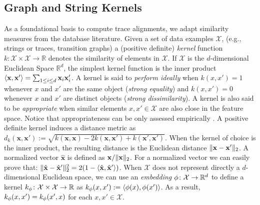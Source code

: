 

\subsection{Graph and String Kernels}\label{subsec:katk}
 As a foundational basis to compute trace alignments, we adapt similarity measures from the database literature.  Given a set of data examples $\mathcal{X}$, (e.g., strings or traces, transition graphs) a (positive definite) \emph{kernel} function $k\colon \mathcal{X}\times \mathcal{X}\to \mathbb{R}$ denotes the similarity of elements in $\mathcal{X}$. If $\mathcal{X}$ is the $d$-dimensional Euclidean Space $\mathbb{R}^d$, the simplest kernel function is the inner product $\Braket{\mathbf{x},\mathbf{x}'}=\sum_{1\leq i\leq d}\mathbf{x}_i\mathbf{x}'_i$.
A kernel is said to \emph{perform ideally} \cite{Gartner03} when $k(x,x')=1$ whenever $x$ and $x'$ are the same object (\textit{strong equality}) and $k(x,x')=0$ whenever $x$ and $x'$ are distinct objects (\textit{strong dissimilarity}). A kernel is also said to be \emph{appropriate} when similar elements $x,x'\in\mathcal{X}$ are also close in the feature space. Notice that appropriateness can be only assessed  empirically \cite{Gartner03}.
A positive definite kernel induces a distance metric as 
$
d_k(\mathbf{x},\mathbf{x}'):=\sqrt{k(\mathbf{x},\mathbf{x})-2k(\mathbf{x},\mathbf{x}')+k(\mathbf{x}',\mathbf{x}')}
$.
When the kernel of choice is the inner product, the resulting distance is the Euclidean distance $\|\mathbf{x}-\mathbf{x}'\|_{2}$. A normalized vector $\hat{\mathbf{x}}$ is defined as $\mathbf{x}/\|\mathbf{x}\|_{2}$. For a normalized vector we can easily prove that: $\|\hat{\mathbf{x}}-\hat{\mathbf{x}}'\|_{2}^2=2(1-\Braket{\hat{\mathbf{x}},\hat{\mathbf{x}}'})$.
When $\mathcal{X}$ does not represent directly a $d$-dimensional Euclidean space, we can use an \emph{embedding} $\phi\colon\mathcal{X}\to \mathbb{R}^d$ to define a kernel $k_\phi\colon \mathcal{X}\times \mathcal{X}\to\mathbb{R}$ as $k_\phi(x,x'):=\Braket{\phi(x),\phi(x')}$. As a result, $k_\phi(x,x')=k_\phi(x',x)$ for each $x,x'\in\mathcal{X}$.



